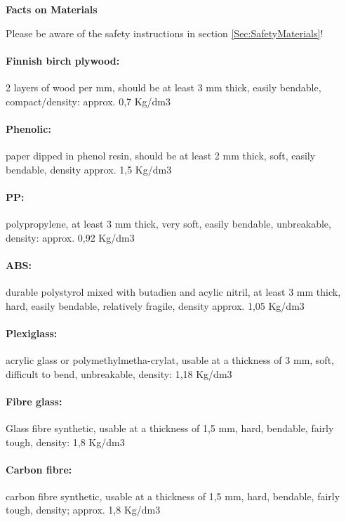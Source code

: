 \begin{center}
\colorbox{BOrange!30}{\parbox{30em}{\centering
\begin{center}
\textbf{Facts on Materials}\\
\end{center}
\colorbox{BOrange!30}{\parbox{28em}{
	\color{black}
	\vspace{-0.5em}
Please be aware of the safety instructions in section \ref{Sec:SafetyMaterials}!
\paragraph*{Finnish birch plywood:} 2 layers of wood per mm, should be at least 3 mm thick, easily bendable, compact/density: approx. 0,7 Kg/dm3
\paragraph*{Phenolic:} paper dipped in phenol resin, should be at least 2 mm thick, soft, easily bendable, density approx. 1,5 Kg/dm3
\paragraph*{PP:} polypropylene, at least 3 mm thick, very soft, easily bendable, unbreakable, density: approx. 0,92 Kg/dm3
\paragraph*{ABS:} durable polystyrol mixed with butadien and acylic nitril, at least 3 mm thick, hard, easily bendable, relatively fragile, density approx. 1,05 Kg/dm3
\paragraph*{Plexiglass:} acrylic glass or polymethylmetha-crylat, usable at a thickness of 3 mm, soft, difficult to bend, unbreakable, density: 1,18 Kg/dm3
\paragraph*{Fibre glass:} Glass fibre synthetic, usable at a thickness of 1,5 mm, hard, bendable, fairly tough, density: 1,8 Kg/dm3
\paragraph*{Carbon fibre:} carbon fibre synthetic, usable at a thickness of 1,5 mm, hard, bendable, fairly tough, density; approx. 1,8 Kg/dm3
	\vspace{0.5em}
}}}}
\end{center}


